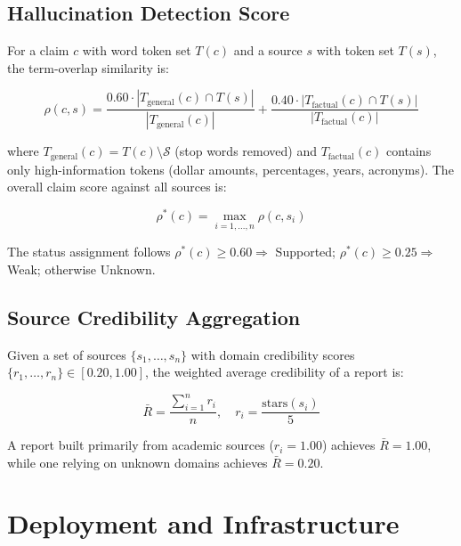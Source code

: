 \documentclass[12pt,a4paper,oneside]{book}
\begin{document}
\section{Hallucination Detection Score}

For a claim $c$ with word token set $T(c)$ and a source $s$ with token set $T(s)$, the term-overlap similarity is:

\begin{equation}
  \rho(c, s) = \frac{0.60 \cdot |T_\text{general}(c) \cap T(s)|}{|T_\text{general}(c)|}
             + \frac{0.40 \cdot |T_\text{factual}(c) \cap T(s)|}{|T_\text{factual}(c)|}
\end{equation}

where $T_\text{general}(c) = T(c) \setminus \mathcal{S}$ (stop words removed) and $T_\text{factual}(c)$ contains only high-information tokens (dollar amounts, percentages, years, acronyms). The overall claim score against all sources is:

\begin{equation}
  \rho^*(c) = \max_{i=1,\ldots,n} \rho(c, s_i)
\end{equation}

The status assignment follows $\rho^*(c) \geq 0.60 \Rightarrow$ Supported; $\rho^*(c) \geq 0.25 \Rightarrow$ Weak; otherwise Unknown.

\section{Source Credibility Aggregation}

Given a set of sources $\{s_1, \ldots, s_n\}$ with domain credibility scores $\{r_1, \ldots, r_n\} \in [0.20, 1.00]$, the weighted average credibility of a report is:

\begin{equation}
  \bar{R} = \frac{\sum_{i=1}^{n} r_i}{n}, \quad r_i = \frac{\text{stars}(s_i)}{5}
\end{equation}

A report built primarily from academic sources ($r_i = 1.00$) achieves $\bar{R} = 1.00$, while one relying on unknown domains achieves $\bar{R} = 0.20$.

\chapter{Deployment and Infrastructure}
\label{chap:deployment}
\end{document}
